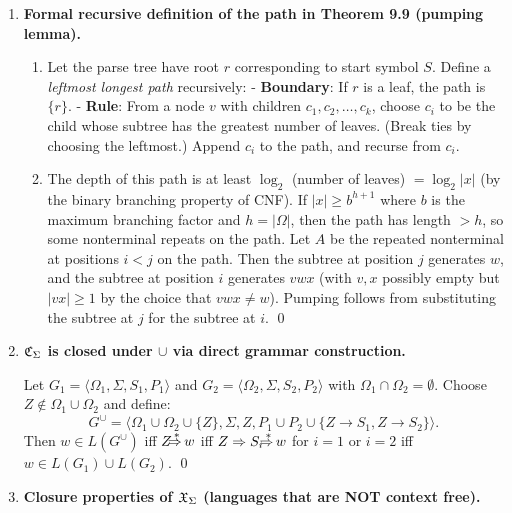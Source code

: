\begin{enumerate}[{9.}1. ]
\textbf{Grammar}: $S \to \pmb{0}S\pmb{1} \mid \pmb{1}S\pmb{0} \mid SS \mid \lambda$.

\textbf{Proof}: By induction, any string with equal numbers of $\pmb{0}$s and $\pmb{1}$s is derivable, and all derivations yield strings with equal counts. So $L(G) = L$. \qed

\item \textbf{Formal recursive definition of the path in Theorem 9.9 (pumping lemma).}

\begin{enumerate}
\item Let the parse tree have root $r$ corresponding to start symbol $S$. Define a \emph{leftmost longest path} recursively:
  - \textbf{Boundary}: If $r$ is a leaf, the path is $\{r\}$.
  - \textbf{Rule}: From a node $v$ with children $c_1, c_2, \ldots, c_k$, choose $c_i$ to be the child whose subtree has the greatest number of leaves. (Break ties by choosing the leftmost.) Append $c_i$ to the path, and recurse from $c_i$.

\item The depth of this path is at least $\log_2$ (number of leaves) $= \log_2 |x|$ (by the binary branching property of CNF). If $|x| \geq b^{h+1}$ where $b$ is the maximum branching factor and $h = |\Omega|$, then the path has length $> h$, so some nonterminal repeats on the path. Let $A$ be the repeated nonterminal at positions $i < j$ on the path. Then the subtree at position $j$ generates $w$, and the subtree at position $i$ generates $vwx$ (with $v,x$ possibly empty but $|vx|\geq 1$ by the choice that $vwx \neq w$). Pumping follows from substituting the subtree at $j$ for the subtree at $i$. \qed
\end{enumerate}

\item \textbf{$\mathfrak{C}_\Sigma$ is closed under $\cup$ via direct grammar construction.}

Let $G_1 = \langle\Omega_1,\Sigma,S_1,P_1\rangle$ and $G_2 = \langle\Omega_2,\Sigma,S_2,P_2\rangle$ with $\Omega_1\cap\Omega_2=\emptyset$. Choose $Z \notin \Omega_1\cup\Omega_2$ and define:
\[
G^\cup = \langle\Omega_1\cup\Omega_2\cup\{Z\},\Sigma,Z,P_1\cup P_2\cup\{Z\to S_1,Z\to S_2\}\rangle.
\]
Then $w \in L(G^\cup)$ iff $Z \DRightarrow w$ iff $Z \Rightarrow S_i \DRightarrow w$ for $i=1$ or $i=2$ iff $w \in L(G_1)\cup L(G_2)$. \qed

\item \textbf{Closure properties of $\mathfrak{X}_\Sigma$ (languages that are NOT context free).}


\end{enumerate}

